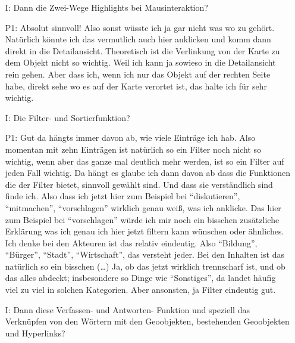 \begin{itemize}
    \item[I:] Dann die Zwei-Wege Highlights bei Mausinteraktion?
    \item[P1:] Absolut sinnvoll! Also sonst w{\"u}sste ich ja gar nicht was wo zu geh{\"o}rt. Nat{\"u}rlich k{\"o}nnte ich das vermutlich auch hier anklicken und komm dann direkt in die Detailansicht. Theoretisch ist die Verlinkung von der Karte zu dem Objekt nicht so wichtig. Weil ich kann ja sowieso in die Detailansicht rein gehen. Aber dass ich, wenn ich nur das Objekt auf der rechten Seite habe, direkt sehe wo es auf der Karte verortet ist, das halte ich f{\"u}r sehr wichtig.
    \item[I:] Die Filter- und Sortierfunktion?
    \item[P1:] Gut da h{\"a}ngts immer davon ab, wie viele Eintr{\"a}ge ich hab. Also momentan mit zehn Eintr{\"a}gen ist nat{\"u}rlich so ein Filter noch nicht so wichtig, wenn aber das ganze mal deutlich mehr werden, ist so ein Filter auf jeden Fall wichtig. Da h{\"a}ngt es glaube ich dann davon ab dass die Funktionen die der Filter bietet, sinnvoll gew{\"a}hlt sind. Und dass sie verst{\"a}ndlich sind finde ich. Also dass ich jetzt hier zum Beispiel bei "`diskutieren"', "`mitmachen"', "`vorschlagen"' wirklich genau wei{\ss}, was ich anklicke. Das hier zum Beispiel bei "`vorschlagen"' w{\"u}rde ich mir noch ein bisschen zus{\"a}tzliche Erkl{\"a}rung was ich genau ich hier jetzt filtern kann w{\"u}nschen oder {\"a}hnliches. Ich denke bei den Akteuren ist das relativ eindeutig. Also "`Bildung"', "`B{\"u}rger"', "`Stadt"', "`Wirtschaft"', das versteht jeder. Bei den Inhalten ist das nat{\"u}rlich so ein bisschen (\dots) Ja, ob das jetzt wirklich trennscharf ist, und ob das alles abdeckt; insbesondere so Dinge wie "`Sonstiges"', da landet h{\"a}ufig viel zu viel in solchen Kategorien. Aber ansonsten, ja Filter eindeutig gut.
    \item[I:] Dann diese Verfassen- und Antworten- Funktion und speziell das Verkn{\"u}pfen von den W{\"o}rtern mit den Geoobjekten, bestehenden Geoobjekten und Hyperlinks?

\end{itemize}
